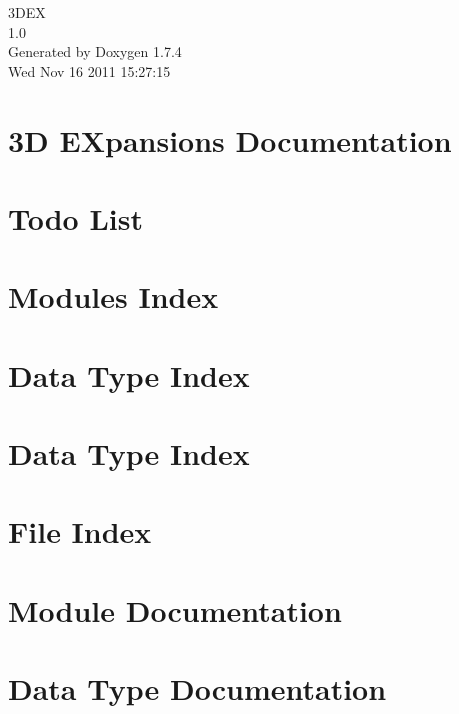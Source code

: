 \documentclass[a4paper]{book}
\begin{document}
\hypersetup{pageanchor=false}
\begin{titlepage}
\vspace*{7cm}
\begin{center}
{\Large 3DEX \\[1ex]\large 1.0 }\\
\vspace*{1cm}
{\large Generated by Doxygen 1.7.4}\\
\vspace*{0.5cm}
{\small Wed Nov 16 2011 15:27:15}\\
\end{center}
\end{titlepage}
\clearemptydoublepage
{}
\tableofcontents
\clearemptydoublepage
{}
\hypersetup{pageanchor=true}
\chapter{3D EXpansions Documentation}
\label{index}\hypertarget{index}{}
\chapter{Todo List}
\label{todo}
\hypertarget{todo}{}

\chapter{Modules Index}

\chapter{Data Type Index}

\chapter{Data Type Index}

\chapter{File Index}

\chapter{Module Documentation}





\chapter{Data Type Documentation}





\end{document}
